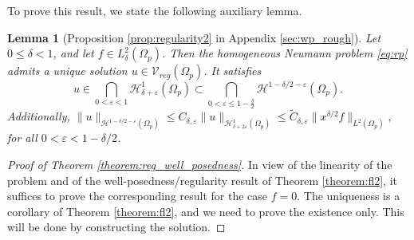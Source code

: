 \documentclass[report]{elsarticle}
\newtheorem{lemma}[theorem]{Lemma}
\numberwithin{theorem}{section}
\newcommand{\re}{\varepsilon}
\begin{document}
To prove this result, we state the following auxiliary lemma.  
\begin{lemma}[Proposition \ref{prop:regularity2} in Appendix \ref{sec:wp_rough}]
	\label{lem:propreg2}
	Let $0\leq \delta<1$, and let $f\in L^2_{\delta}(\Omega_p)$. 
	Then the homogeneous Neumann problem \eqref{eq:rp} admits a unique solution $u\in \mathcal{V}_{reg}(\Omega_p)$. It satisfies $$u\in \bigcap_{0<\re<1}\mathcal{H}^1_{\delta+\re}(\Omega_p)\subset \bigcap_{0<\re\leq 1-\frac{\delta}{2}}\mathcal{H}^{1-\delta/2-\re}(\Omega_p).$$ Additionally,  $\|u\|_{\mathcal{H}^{1-\delta/2-\re}(\Omega_p)}\leq C_{\delta,\re} \|u\|_{\mathcal{H}^1_{\delta+2\re}(\Omega_p)}\leq \tilde{C}_{\delta,\re} \|x^{\delta/2}f\|_{L^2(\Omega_p)},$ for all $0<\re<1-\delta/2$. 
\end{lemma}


\begin{proof}[Proof of Theorem \ref{theorem:reg_well_posedness}]
	In view of the linearity of the problem and of the well-posedness/regularity result of Theorem \ref{theorem:fl2}, it suffices to prove the corresponding result for the case $f=0$.  The uniqueness is a corollary of Theorem \ref{theorem:fl2}, and we need to prove the existence only. This will be done by constructing the solution.
	

\end{proof}
\end{document}
